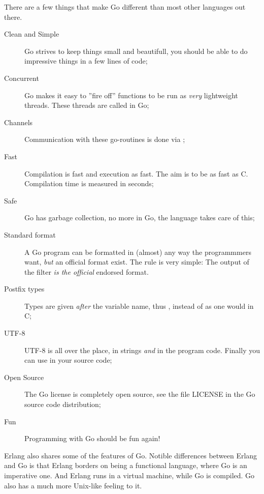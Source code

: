 \noindent{}There are a few things that make Go different than most other
languages out there.
\begin{description}
\item[Clean and Simple]
Go strives to keep things small and beautifull, you should
be able to do impressive things in a few lines of code;
\item[Concurrent]
Go makes it easy to ''fire off'' functions to be
run as \emph{very} lightweight threads. These threads are called
 in Go;

\item[Channels] 
Communication with these go-routines is done
via  \cite{csp}\cite{hoare};

\item[Fast]
Compilation is fast and execution as fast. The aim is
to be as fast as C. Compilation time is measured in seconds;

\item[Safe]
Go has garbage collection, no more  in Go,
the language takes care of this;

\item[Standard format]
A Go program can be formatted in (almost) any way the programmmers want,
\emph{but} an official format exist. The rule is very simple:
The output of the filter  \emph{is the official} endorsed
format.

\item[Postfix types]
Types are given \emph{after} the variable name, thus ,
instead of  as one would in C;

\item[UTF-8]
UTF-8 is all over the place, in strings
\emph{and} in the program code. Finally you can use  in your source code;

\item[Open Source]
The Go license is completely open source, see the file LICENSE in the Go
source code distribution;

\item[Fun]
Programming with Go should be fun again!

\end{description}
Erlang \cite{erlang} also shares some
of the features of Go. Notible differences between Erlang
and Go is that Erlang borders on being a functional language,
where Go is an imperative one. And Erlang runs in a virtual
machine, while Go is compiled. Go also has a much more Unix-like
feeling to it.

